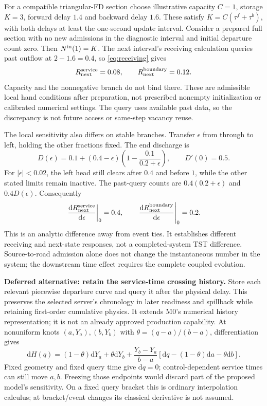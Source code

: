 \documentclass[11pt]{article}
\newcommand{\dd}{\mathrm d}
\begin{document}
For a compatible triangular-FD section choose illustrative capacity $C=1$, storage $K=3$, forward delay $1.4$ and backward delay $1.6$. These satisfy $K=C(\tau^f+\tau^b)$, with both delays at least the one-second update interval. Consider a prepared full section with no new admissions in the diagnostic interval and initial departure count zero. Then $N^{\rm in}(1)=K$. The next interval's receiving calculation queries past outflow at $2-1.6=0.4$, so \eqref{eq:receiving} gives
\begin{equation}
 R_{\rm next}^{\rm service}=0.08,\qquad
 R_{\rm next}^{\rm boundary}=0.12.
 \label{eq:history-choice-receiving}
\end{equation}
Capacity and the nonnegative branch do not bind there. These are admissible local hand conditions after preparation, not prescribed nonempty initialization or calibrated numerical settings. The query uses available past data, so the discrepancy is not future access or same-step vacancy reuse.

The local sensitivity also differs on stable branches. Transfer $\epsilon$ from through to left, holding the other fractions fixed. The end discharge is
\begin{equation}
 D(\epsilon)=0.1+(0.4-\epsilon)
 \left(1-\frac{0.1}{0.2+\epsilon}\right),\qquad
 D'(0)=0.5.
 \label{eq:history-choice-total}
\end{equation}
For $|\epsilon|<0.02$, the left head still clears after $0.4$ and before $1$, while the other stated limits remain inactive. The past-query counts are $0.4(0.2+\epsilon)$ and $0.4D(\epsilon)$. Consequently
\begin{equation}
 \left.\frac{\dd R_{\rm next}^{\rm service}}{\dd\epsilon}\right|_0=0.4,
 \qquad
 \left.\frac{\dd R_{\rm next}^{\rm boundary}}{\dd\epsilon}\right|_0=0.2.
 \label{eq:history-choice-sensitivity}
\end{equation}
This is an analytic difference away from event ties. It establishes different receiving and next-state responses, not a completed-system TST difference. Source-to-road admission alone does not change the instantaneous number in the system; the downstream time effect requires the complete coupled evolution.

\textbf{Deferred alternative: retain the service-time crossing history.} Store each relevant piecewise departure curve and query it after the physical delay. This preserves the selected server's chronology in later readiness and spillback while retaining first-order cumulative physics. It extends M0's numerical history representation; it is not an already approved production capability. At nonuniform knots $(a,Y_a),(b,Y_b)$ with $\theta=(q-a)/(b-a)$, differentiation gives
\begin{equation}
 \dd H(q)=(1-\theta)\dd Y_a+\theta\dd Y_b
 +\frac{Y_b-Y_a}{b-a}
 \left[\dd q-(1-\theta)\dd a-\theta\dd b\right].
 \label{eq:history-choice-knot-derivative}
\end{equation}
Fixed geometry and fixed query time give $\dd q=0$; control-dependent service times can still move $a,b$. Freezing those endpoints would discard part of the proposed model's sensitivity. On a fixed query bracket this is ordinary interpolation calculus; at bracket/event changes its classical derivative is not assumed.
\end{document}
